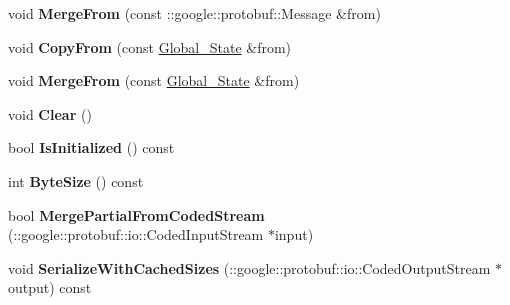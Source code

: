 \begin{DoxyCompactItemize}
\item 
\hypertarget{classvss__state_1_1Global__State_ad2905d67a08d3e766963be4d20438dee}{void {\bfseries Merge\-From} (const \-::google\-::protobuf\-::\-Message \&from)}\label{classvss__state_1_1Global__State_ad2905d67a08d3e766963be4d20438dee}

\item 
\hypertarget{classvss__state_1_1Global__State_aba34386a742582208d2ead2116512710}{void {\bfseries Copy\-From} (const \hyperlink{classvss__state_1_1Global__State}{Global\-\_\-\-State} \&from)}\label{classvss__state_1_1Global__State_aba34386a742582208d2ead2116512710}

\item 
\hypertarget{classvss__state_1_1Global__State_a429e2ccd5b142708a51a3bd069455f52}{void {\bfseries Merge\-From} (const \hyperlink{classvss__state_1_1Global__State}{Global\-\_\-\-State} \&from)}\label{classvss__state_1_1Global__State_a429e2ccd5b142708a51a3bd069455f52}

\item 
\hypertarget{classvss__state_1_1Global__State_a9c2d7a9cf4dd3c01b53a749e25b0d0fb}{void {\bfseries Clear} ()}\label{classvss__state_1_1Global__State_a9c2d7a9cf4dd3c01b53a749e25b0d0fb}

\item 
\hypertarget{classvss__state_1_1Global__State_ab2c7e2d4af0cd33383e9a4bd1a83113f}{bool {\bfseries Is\-Initialized} () const }\label{classvss__state_1_1Global__State_ab2c7e2d4af0cd33383e9a4bd1a83113f}

\item 
\hypertarget{classvss__state_1_1Global__State_a10790a0ee8bcc6cff1f704ad0dce113c}{int {\bfseries Byte\-Size} () const }\label{classvss__state_1_1Global__State_a10790a0ee8bcc6cff1f704ad0dce113c}

\item 
\hypertarget{classvss__state_1_1Global__State_a6441ee848d925dd1cd3bca5e30c28c7f}{bool {\bfseries Merge\-Partial\-From\-Coded\-Stream} (\-::google\-::protobuf\-::io\-::\-Coded\-Input\-Stream $\ast$input)}\label{classvss__state_1_1Global__State_a6441ee848d925dd1cd3bca5e30c28c7f}

\item 
\hypertarget{classvss__state_1_1Global__State_a01a832c00539c849c8171ff3a228f0df}{void {\bfseries Serialize\-With\-Cached\-Sizes} (\-::google\-::protobuf\-::io\-::\-Coded\-Output\-Stream $\ast$output) const }\label{classvss__state_1_1Global__State_a01a832c00539c849c8171ff3a228f0df}


\end{DoxyCompactItemize}
